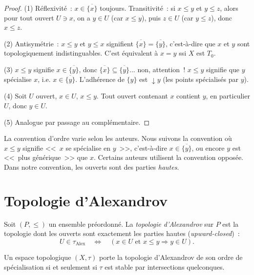 \begin{proof}
(1) R\'eflexivit\'e~: $x \in \overline{\{x\}}$ toujours. Transitivit\'e~: si $x \leq y$ et
$y \leq z$, alors pour tout ouvert $U \ni x$, on a $y \in U$ (car $x \leq y$), puis
$z \in U$ (car $y \leq z$), donc $x \leq z$.

(2) Antisym\'etrie~: $x \leq y$ et $y \leq x$ signifient $\overline{\{x\}} =
\overline{\{y\}}$, c'est-\`a-dire que $x$ et $y$ sont topologiquement indistinguables.
C'est \'equivalent \`a $x = y$ ssi $X$ est $T_0$.

(3) $x \leq y$ signifie $x \in \overline{\{y\}}$, donc $\overline{\{x\}} \subseteq
\overline{\{y\}}$... non, attention~! $x \leq y$ signifie que $y$ sp\'ecialise $x$, i.e.
$x \in \overline{\{y\}}$. L'adh\'erence de $\{y\}$ est $\downarrow y$ (les points
sp\'ecialis\'es par $y$).

(4) Soit $U$ ouvert, $x \in U$, $x \leq y$. Tout ouvert contenant $x$ contient $y$, en
particulier $U$, donc $y \in U$.

(5) Analogue par passage au compl\'ementaire.
\end{proof}

\begin{attention}
La convention d'ordre varie selon les auteurs. Nous suivons la convention o\`u
$x \leq y$ signifie <<~$x$ se sp\'ecialise en $y$~>>, c'est-\`a-dire $x \in \overline{\{y\}}$,
ou encore $y$ est <<~plus g\'en\'erique~>> que $x$. Certains auteurs utilisent la convention
oppos\'ee. Dans notre convention, les ouverts sont des parties \emph{hautes}.
\end{attention}

\section{Topologie d'Alexandrov}

\begin{definition}
Soit $(P, \leq)$ un ensemble pr\'eordonn\'e. La \emph{topologie d'Alexandrov} sur $P$ est
la topologie dont les ouverts sont exactement les parties hautes (\emph{upward-closed})~:
\[
  U \in \tau_{\mathrm{Alex}} \quad \Longleftrightarrow \quad
  (x \in U \text{ et } x \leq y \Rightarrow y \in U).
\]
\end{definition}

\begin{theoreme}
Un espace topologique $(X,\tau)$ porte la topologie d'Alexandrov de son ordre de
sp\'ecialisation si et seulement si $\tau$ est stable par intersections quelconques.
\end{theoreme}

